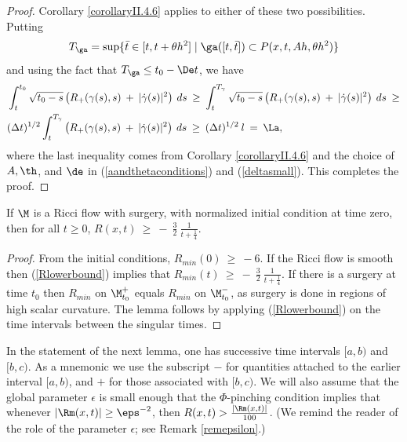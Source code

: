 \begin{proof}
Corollary \ref{corollaryII.4.6} applies to either of these
two possibilities. Putting
\begin{equation}
T_\ga= \sup\{\bar t\in [t,t+\theta h^2]\mid \ga([t,\bar t])\subset
P(x,t,Ah,\theta h^2)\}
\end{equation}
and using the fact that $T_\ga \le t_0 - \De t$,
we have
\begin{align}
& \int_{t}^{t_0} \sqrt{t_0 - s} \left( R_+(\gamma(s), s) \: + \:
|\dot{\gamma}(s)|^2 \right) \: ds \: \ge \:
\int_{t}^{T_\gamma}
\sqrt{t_0 - s} \left( R_+(\gamma(s), s) \: + \:
|\dot{\gamma}(s)|^2 \right) \: ds \: \ge \\
& (\Delta t)^{1/2} \int_{t}^{T_\gamma}
\left( R_+(\gamma(s), s) \: + \:
|\dot{\gamma}(s)|^2 \right) \: ds \: \ge \:
(\Delta t)^{1/2} \: l \: = \: \La, \notag
\end{align}
where the last inequality comes from Corollary \ref{corollaryII.4.6}
and the choice
of $A,\th$, and $\de$ in (\ref{aandthetaconditions}) and (\ref{deltasmall}).
This completes the proof.
\end{proof}

\begin{lemma}
  \label{lem:kl-establishing-noncollapsing-presence-surgery-vanishing-noncollapsing}
 \label{Rev}
If $\M$ is a Ricci flow with surgery, with normalized initial
condition at time zero, then for all $t \ge 0$, $R(x,t) \: \ge \:
- \: \frac{3}{2} \: \frac{1}{t+\frac14}$.
\end{lemma}
\begin{proof}
From the initial conditions, $R_{min}(0) \: \ge \: -6$.
If the Ricci flow is smooth then
(\ref{Rlowerbound}) implies
that $R_{min}(t) \: \ge \: - \: \frac{3}{2} \: \frac{1}{t+\frac14}$.
If there is a surgery
at time $t_0$ then $R_{min}$ on $\M_{t_0}^+$ equals
$R_{min}$ on $\M_{t_0}^-$, as surgery is done in
regions of high scalar curvature.  The lemma follows by applying
(\ref{Rlowerbound}) on the time intervals between
the singular times.
\end{proof}

In the statement of the next lemma, one has successive
time intervals $[a,b)$ and $[b,c)$. As a mnemonic we
use the subscript $-$ for quantities attached to the
earlier interval $[a,b)$, and $+$ for those associated with $[b,c)$.
We will also assume that the global parameter $\epsilon$ is small
enough that the $\Phi$-pinching condition
implies that whenever $|\Rm(x,t)|\geq \eps^{-2}$, then
$R(x,t)>\frac{|\Rm(x,t)|}{100}$.
(We  remind the reader of the role of the parameter
$\epsilon$; see Remark \ref{remepsilon}.)

